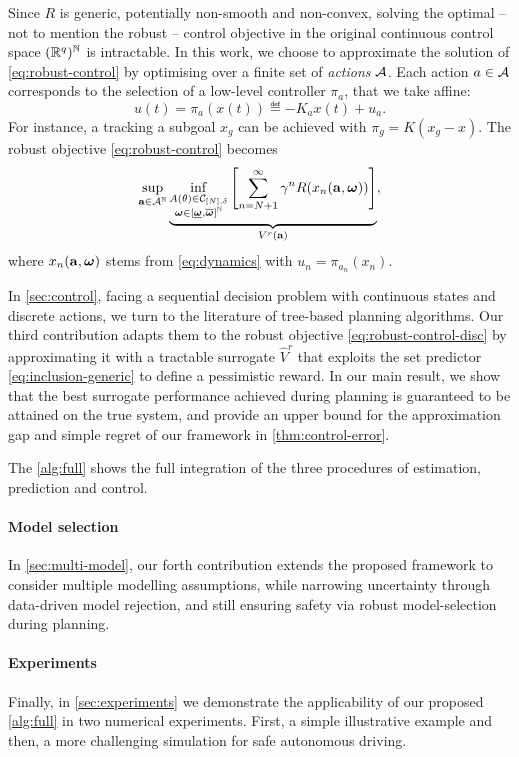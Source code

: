 Since $R$ is generic, potentially non-smooth and non-convex, solving the optimal -- not to mention the robust -- control objective in the original continuous control space $(\mathbb{R}^q)^{\mathbb{N}}$ is intractable.
In this work, we choose to approximate the solution of \eqref{eq:robust-control} by optimising over a finite set of \emph{actions} $\mathcal{A}$. Each action $a\in\mathcal{A}$ corresponds to the selection of a low-level controller $\pi_a$, that we take affine:
\[u(t) = \pi_a(x(t)) \eqdef -K_a x(t) + u_a.\]
For instance, a tracking a subgoal $x_g$ can be achieved with $\pi_g = K(x_g - x)$. The robust objective \eqref{eq:robust-control} becomes 
\begin{equation}
\label{eq:robust-control-disc}
\sup_{\mathbf{a}\in{\mathcal{A}}^{\mathbb{N}}} \underbrace{\inf_{\substack{A(\theta) \in \mathcal{C}_{[N],\delta} \\ \bm{\omega}\in[\underline{\bm{\omega}},\overline{\bm{\omega}}]^{\mathbb{N}}}} \left[\sum_{n=N+1}^\infty \gamma^n R(x_n(\mathbf{a},\bm{\omega}))\right]}_{V^r(\mathbf{a})},
\end{equation}
where $x_n(\mathbf{a}, \bm{\omega})$ stems from \eqref{eq:dynamics} with $u_n = \pi_{a_n}(x_n)$.

In \autoref{sec:control}, facing a sequential decision problem with continuous states and discrete actions, we turn to the literature of tree-based planning algorithms. Our third contribution adapts them to the robust objective \eqref{eq:robust-control-disc} by approximating it with a tractable surrogate $\hat{V}^r$ that exploits the set predictor \eqref{eq:inclusion-generic} to define a pessimistic reward. In our main result, we show that the best surrogate performance achieved during planning is guaranteed to be attained on the true system, and provide an upper bound for the approximation gap and simple regret of our framework in \autoref{thm:control-error}.

The \autoref{alg:full} shows the full integration of the three procedures of estimation, prediction and control. 

\paragraph{Model selection} In \autoref{sec:multi-model}, our forth contribution extends the proposed framework to consider multiple modelling assumptions, while narrowing uncertainty through data-driven model rejection, and still ensuring safety via robust model-selection during planning.

\paragraph{Experiments} Finally, in \autoref{sec:experiments} we demonstrate the applicability of our proposed \autoref{alg:full} in two numerical experiments. First, a simple illustrative example and then, a more challenging simulation for safe autonomous driving.


